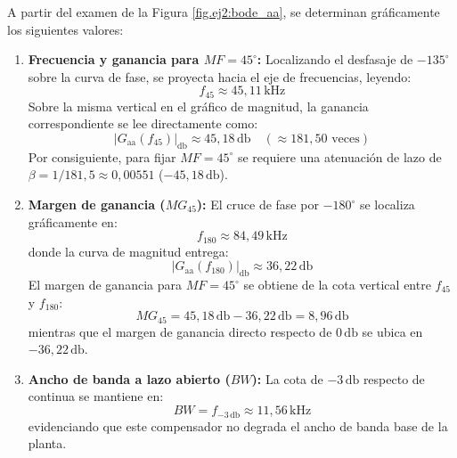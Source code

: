 A partir del examen de la Figura \ref{fig.ej2:bode_aa}, se determinan gráficamente los siguientes valores:

\begin{enumerate}
    \item \textbf{Frecuencia y ganancia para $MF = 45^\circ$:} Localizando el desfasaje de $-135^\circ$ sobre la curva de fase,
    se proyecta hacia el eje de frecuencias, leyendo:
    \begin{equation}
        f_{45} \approx 45,11\,\si{\kilo\hertz}
    \end{equation}
    Sobre la misma vertical en el gráfico de magnitud, la ganancia correspondiente se lee directamente como:
    \begin{equation}
        |G_{\text{aa}}(f_{45})|_{\si{\decibel}} \approx 45,18\,\si{\decibel} \quad (\approx 181,50\text{ veces})
    \end{equation}
    Por consiguiente, para fijar $MF = 45^\circ$ se requiere una atenuación de lazo de $\beta = 1/181,5 \approx 0,00551$ ($-45,18\,\si{\decibel}$).

    \item \textbf{Margen de ganancia ($MG_{45}$):} El cruce de fase por $-180^\circ$ se localiza gráficamente en:
    \begin{equation}
        f_{180} \approx 84,49\,\si{\kilo\hertz}
    \end{equation}
    donde la curva de magnitud entrega:
    \begin{equation}
        |G_{\text{aa}}(f_{180})|_{\si{\decibel}} \approx 36,22\,\si{\decibel}
    \end{equation}
    El margen de ganancia para $MF = 45^\circ$ se obtiene de la cota vertical entre $f_{45}$ y $f_{180}$:
    \begin{equation}
        MG_{45} = 45,18\,\si{\decibel} - 36,22\,\si{\decibel} = 8,96\,\si{\decibel}
    \end{equation}
    mientras que el margen de ganancia directo respecto de $0\,\si{\decibel}$ se ubica en $-36,22\,\si{\decibel}$.

    \item \textbf{Ancho de banda a lazo abierto ($BW$):} La cota de $-3\,\si{\decibel}$ respecto de continua se mantiene en:
    \begin{equation}
        BW = f_{-3\,\si{\decibel}} \approx 11,56\,\si{\kilo\hertz}
    \end{equation}
    evidenciando que este compensador no degrada el ancho de banda base de la planta.
\end{enumerate}

